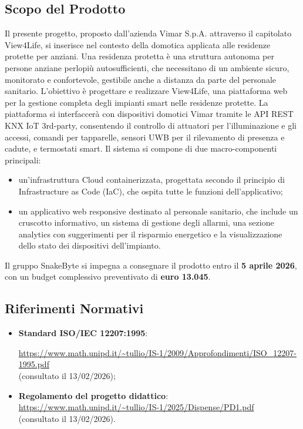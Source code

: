 \documentclass[10pt, letterpaper]{article}
\begin{document}
\subsection{Scopo del Prodotto}
Il presente progetto, proposto dall'azienda Vimar S.p.A. attraverso il capitolato View4Life, si inserisce nel contesto della domotica applicata alle residenze protette per anziani. Una residenza protetta è una struttura autonoma per persone anziane perlopiù autosufficienti, che necessitano di un ambiente sicuro, monitorato e confortevole, gestibile anche a distanza da parte del personale sanitario.
L'obiettivo è progettare e realizzare View4Life, una piattaforma web per la gestione completa degli impianti smart nelle residenze protette. La piattaforma si interfaccerà con dispositivi domotici Vimar tramite le API REST KNX IoT 3rd-party, consentendo il controllo di attuatori per l'illuminazione e gli accessi, comandi per tapparelle, sensori UWB per il rilevamento di presenza e cadute, e termostati smart.
Il sistema si compone di due macro-componenti principali:
\begin{itemize}
    \item un'infrastruttura Cloud containerizzata, progettata secondo il principio di Infrastructure as Code (IaC), che ospita tutte le funzioni dell'applicativo;
    \item un applicativo web responsive destinato al personale sanitario, che include un cruscotto informativo, un sistema di gestione degli allarmi, una sezione analytics con suggerimenti per il risparmio energetico e la visualizzazione dello stato dei dispositivi dell'impianto.

\end{itemize}

Il gruppo SnakeByte si impegna a consegnare il prodotto entro il \textbf{5 aprile 2026}, con un budget complessivo preventivato di \textbf{euro 13.045}.


\subsection{Riferimenti Normativi}
\begin{itemize}
    \item \textbf{Standard ISO/IEC 12207:1995}:

        \url{https://www.math.unipd.it/~tullio/IS-1/2009/Approfondimenti/ISO_12207-1995.pdf}
        \\ (consultato il 13/02/2026);
    \item \textbf{Regolamento del progetto didattico}:
        \\ \url{https://www.math.unipd.it/~tullio/IS-1/2025/Dispense/PD1.pdf}
        \\ (consultato il 13/02/2026).
\end{itemize}
\end{document}
